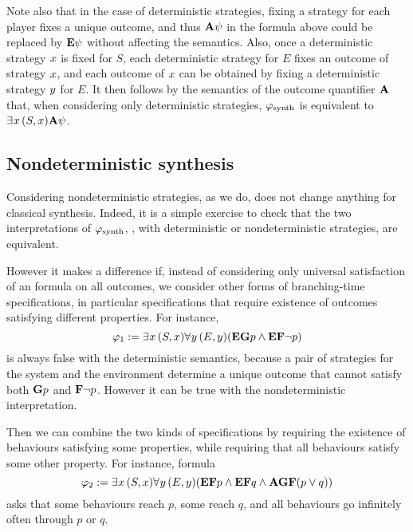 Note also that in the case of deterministic strategies, fixing a
strategy for each player fixes a unique outcome, and thus $\A\psi$ in
the formula above could be replaced by $\E\psi$ without affecting the semantics.
Also, once a deterministic strategy $\var$ is fixed for $S$, each
deterministic strategy for $E$ fixes an outcome of strategy $\var$, and each outcome
of $\var$ can be obtained by fixing a deterministic strategy $\varb$
for $E$. It then follows by the
semantics of the outcome quantifier $\A$ that, when
considering only deterministic strategies,
$\phisynth$ is equivalent to $\Estratnd(S,\var)\A\psi$.

\subsection{Nondeterministic synthesis}
\label{sec-nd-synth}

Considering nondeterministic strategies, as we do, does not change
anything for classical \LTL synthesis. Indeed, it is a simple exercise
to check that the two interpretations of $\phisynth$, \ie, with
deterministic or nondeterministic strategies, are equivalent.


However it makes a difference if, instead of considering only
universal satisfaction of an \LTL formula on all outcomes, we consider
other forms of branching-time specifications, in particular
specifications that require existence of outcomes satisfying different
properties. For instance,
\[\phi_1:=\Estratnd (S,\var) \Astratnd[\varb] (E,\varb) (\E \always p \wedge \E \F \neg p)\] 
is always false with the deterministic semantics, because a pair of
strategies for the system and the environment determine a unique
outcome that cannot satisfy both $\always p$ and $\F\neg p$.
However it can be true with the
nondeterministic interpretation.

Then we can combine the two kinds of specifications by  requiring the
existence of behaviours satisfying some properties, while requiring
that all  behaviours satisfy some other property.
For instance, formula
\[\phi_2:=\Estratnd (S,\var) \Astratnd[\varb] (E,\varb)(\E \F p \wedge \E \F
  q \wedge \A \always \F (p\vee q))\]
  asks that some behaviours 
 reach $p$, some  reach $q$, and all behaviours go infinitely
 often through $p$ or $q$.

